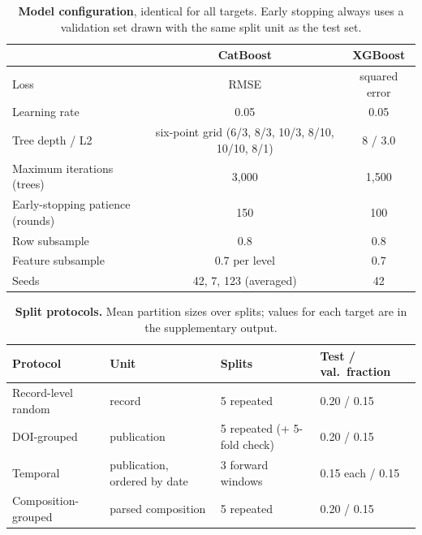 \documentclass[11pt]{article}
\begin{document}
\begin{table}[htbp]
    \centering\small
    \caption{\textbf{Model configuration}, identical for all targets. Early stopping always uses a validation set drawn with the same split unit as the test set.}
    \label{tab:config}
    \begin{tabular}{@{}lcc@{}}
        \toprule
        & CatBoost & XGBoost \\
        \midrule
        Loss                               & RMSE & squared error \\
        Learning rate                      & 0.05 & 0.05 \\
        Tree depth / L2                    & six-point grid (6/3, 8/3, 10/3, 8/10, 10/10, 8/1) & 8 / 3.0 \\
        Maximum iterations (trees)         & 3,000 & 1,500 \\
        Early-stopping patience (rounds)   & 150 & 100 \\
        Row subsample                      & 0.8 & 0.8 \\
        Feature subsample                  & 0.7 per level & 0.7 \\
        Seeds                              & 42, 7, 123 (averaged) & 42 \\
        \bottomrule
    \end{tabular}
\end{table}

\begin{table}[htbp]
    \centering\small
    \caption{\textbf{Split protocols.} Mean partition sizes over splits; values for each target are in the supplementary output.}
    \label{tab:protocol}
    \begin{tabular}{@{}llll@{}}
        \toprule
        Protocol & Unit & Splits & Test / val.\ fraction \\
        \midrule
        Record-level random & record & 5 repeated & 0.20 / 0.15 \\
        DOI-grouped & publication & 5 repeated (+ 5-fold check) & 0.20 / 0.15 \\
        Temporal & publication, ordered by date & 3 forward windows & 0.15 each / 0.15 \\
        Composition-grouped & parsed composition & 5 repeated & 0.20 / 0.15 \\
        \bottomrule
    \end{tabular}
\end{table}
\end{document}
